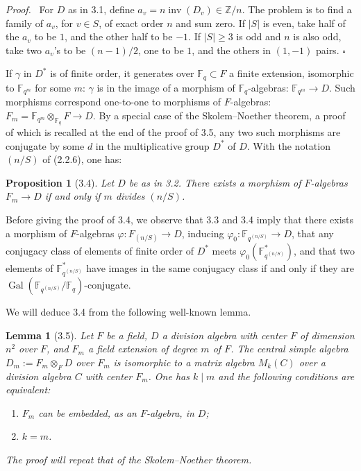 \documentclass[10pt]{article}
\newcommand{\Fq}{\mathbb F_q}
\newcommand{\Z}{\mathbb Z}
\newcommand{\Gal}{\operatorname{Gal}}
\newcommand{\inv}{\operatorname{inv}}
\theoremstyle{deligne}
\newtheorem*{proposition*}{Proposition}
\newtheorem*{lemma*}{Lemma}
\newenvironment{proofdel}[1][Proof.]{\textit{#1}\ }{\hfill$\square$}
\newcommand{\heading}[1]{\vspace{0.7em}\noindent{\bfseries #1}\quad}
\begin{document}
\begin{proofdel}
For $D$ as in 3.1, define $a_v=n\inv(D_v)\in\Z/n$. The problem is to find a family of $a_v$, for $v\in S$, of exact order $n$ and sum zero. If $|S|$ is even, take half of the $a_v$ to be $1$, and the other half to be $-1$. If $|S|\ge3$ is odd and $n$ is also odd, take two $a_v$'s to be $(n-1)/2$, one to be $1$, and the others in $(1,-1)$ pairs.
\end{proofdel}

\heading{3.3.} If $\gamma$ in $D^*$ is of finite order, it generates over $\Fq\subset F$ a finite extension, isomorphic to $\mathbb F_{q^m}$ for some $m$: $\gamma$ is in the image of a morphism of $\Fq$-algebras: $\mathbb F_{q^m}\to D$. Such morphisms correspond one-to-one to morphisms of $F$-algebras: $F_m=\mathbb F_{q^m}\otimes_{\Fq}F\to D$. By a special case of the Skolem--Noether theorem, a proof of which is recalled at the end of the proof of 3.5, any two such morphisms are conjugate by some $d$ in the multiplicative group $D^*$ of $D$. With the notation $(n/S)$ of (2.2.6), one has:

\begin{proposition*}[3.4]
Let $D$ be as in 3.2. There exists a morphism of $F$-algebras $F_m\to D$ if and only if $m$ divides $(n/S)$.
\end{proposition*}

Before giving the proof of 3.4, we observe that 3.3 and 3.4 imply that there exists a morphism of $F$-algebras $\varphi:F_{(n/S)}\to D$, inducing $\varphi_0:\mathbb F_{q^{(n/S)}}\to D$, that any conjugacy class of elements of finite order of $D^*$ meets $\varphi_0(\mathbb F_{q^{(n/S)}}^*)$, and that two elements of $\mathbb F_{q^{(n/S)}}^*$ have images in the same conjugacy class if and only if they are $\Gal(\mathbb F_{q^{(n/S)}}/\Fq)$-conjugate.

We will deduce 3.4 from the following well-known lemma.

\begin{lemma*}[3.5]
Let $F$ be a field, $D$ a division algebra with center $F$ of dimension $n^2$ over $F$, and $F_m$ a field extension of degree $m$ of $F$. The central simple algebra $D_m:=F_m\otimes_FD$ over $F_m$ is isomorphic to a matrix algebra $M_k(C)$ over a division algebra $C$ with center $F_m$. One has $k\mid m$ and the following conditions are equivalent:
\begin{enumerate}[label=(\roman*)]
\item $F_m$ can be embedded, as an $F$-algebra, in $D$;
\item $k=m$.
\end{enumerate}
The proof will repeat that of the Skolem--Noether theorem.
\end{lemma*}
\end{document}
